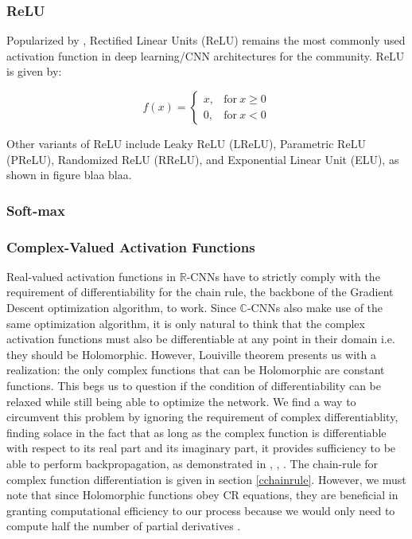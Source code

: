    \subsubsection{ReLU}
   
Popularized by \cite{krizhevsky2012imagenet}, Rectified Linear Units (ReLU) \cite{nair2010rectified} remains the most commonly used activation function in deep learning/CNN architectures for the community. ReLU is given by:

\begin{equation}
f(x) =  
\begin{cases} 
x , &\textrm{for} \ x\ge 0\\
0 , &\textrm{for} \ x < 0
\end{cases}
\end{equation}
 
 
 Other variants of ReLU include Leaky ReLU (LReLU), Parametric ReLU (PReLU), Randomized ReLU (RReLU), and Exponential Linear Unit (ELU), as shown in figure blaa blaa. 
  
 \subsubsection{Soft-max}
  
 \subsubsection{Complex-Valued Activation Functions}\label{cvaf}
 
 Real-valued activation functions in $\mathbb{R}$-CNNs have to strictly comply with the requirement of differentiability for the chain rule, the backbone of the Gradient Descent optimization algorithm, to work. Since $\mathbb{C}$-CNNs also make use of the 
 same optimization algorithm, it is only natural to think that the complex activation functions must also be differentiable at any point in their domain i.e. they should be Holomorphic. However, Louiville theorem presents us with a realization: the only complex functions that can be  Holomorphic are constant functions. This begs us to question if the condition of differentiability can be relaxed while still being able to optimize the network.
 We find a way to circumvent this problem by ignoring the requirement of complex differentiablity, finding solace in the fact that as long as the complex function is differentiable with respect to its real part and its imaginary part, it provides sufficiency to be able to perform backpropagation, as demonstrated in \cite{trabelsi2018deep}, \cite{hansch2010complex}, \cite{polsarzhang2017complex}. The chain-rule for complex function differentiation is given in section \ref{cchainrule}. However, we must note that since Holomorphic functions obey CR equations, they are beneficial in granting computational efficiency to our process because we would only need to compute half the number of partial derivatives \cite{sarroff2015learning}.
 
